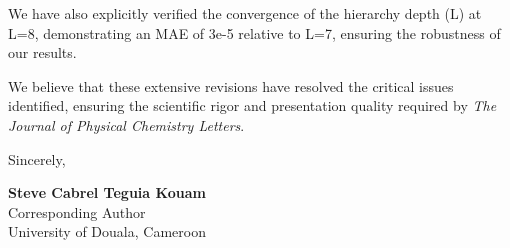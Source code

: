 \documentclass[11pt]{article}
\begin{document}
\vspace{3em}

\noindent We have also explicitly verified the convergence of the hierarchy depth (L) at L=8, demonstrating an MAE of 3e-5 relative to L=7, ensuring the robustness of our results.

We believe that these extensive revisions have resolved the critical issues identified, ensuring the scientific rigor and presentation quality required by \textit{The Journal of Physical Chemistry Letters}.

\vspace{1.5em}

\noindent Sincerely,

\vspace{2.5em}

\noindent \textbf{Steve Cabrel Teguia Kouam}\\
Corresponding Author\\
University of Douala, Cameroon
\end{document}
